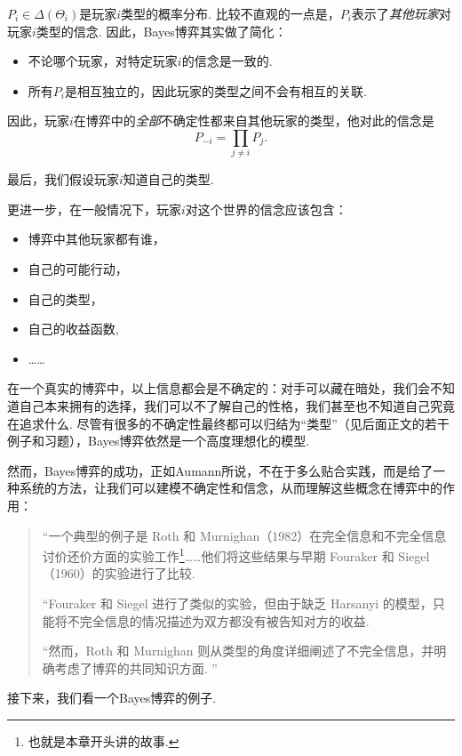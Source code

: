 $P_i\in\Delta(\Theta_i)$是玩家$i$类型的概率分布. 比较不直观的一点是，$P_i$表示了\textit{其他玩家}对玩家$i$类型的信念. 因此，Bayes博弈其实做了简化：
\begin{itemize}
    \item 不论哪个玩家，对特定玩家$i$的信念是一致的.
    \item 所有$P_i$是相互独立的，因此玩家的类型之间不会有相互的关联. 
\end{itemize}
因此，玩家$i$在博弈中的\textit{全部}不确定性都来自其他玩家的类型，他对此的信念是
\[P_{-i}=\prod_{j\neq i}P_j.\]

最后，我们假设玩家$i$知道自己的类型.

更进一步，在一般情况下，玩家$i$对这个世界的信念应该包含：
\begin{itemize}
    \item 博弈中其他玩家都有谁，
    \item 自己的可能行动，
    \item 自己的类型，
    \item 自己的收益函数,
    \item ……
\end{itemize}
在一个真实的博弈中，以上信息都会是不确定的：对手可以藏在暗处，我们会不知道自己本来拥有的选择，我们可以不了解自己的性格，我们甚至也不知道自己究竟在追求什么. 尽管有很多的不确定性最终都可以归结为“类型”（见后面正文的若干例子和习题），Bayes博弈依然是一个高度理想化的模型. 

然而，Bayes博弈的成功，正如Aumann所说，不在于多么贴合实践，而是给了一种系统的方法，让我们可以建模不确定性和信念，从而理解这些概念在博弈中的作用：
\begin{quotation}
    “一个典型的例子是 Roth 和 Murnighan（1982）在完全信息和不完全信息讨价还价方面的实验工作\footnote{也就是本章开头讲的故事. }……他们将这些结果与早期 Fouraker 和 Siegel（1960）的实验进行了比较. 

    “Fouraker 和 Siegel 进行了类似的实验，但由于缺乏 Harsanyi 的模型，只能将不完全信息的情况描述为双方都没有被告知对方的收益. 
    
    “然而，Roth 和 Murnighan 则从类型的角度详细阐述了不完全信息，并明确考虑了博弈的共同知识方面. ”
\end{quotation}

接下来，我们看一个Bayes博弈的例子. 

